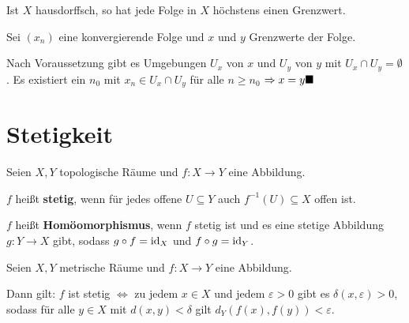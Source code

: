 \begin{bemerkung}
    Ist $X$ hausdorffsch, so hat jede Folge in $X$ höchstens einen
    Grenzwert.
\end{bemerkung}

\begin{beweis}
    Sei $(x_n)$ eine konvergierende Folge und $x$ und $y$ Grenzwerte der Folge.

    Nach Voraussetzung gibt es Umgebungen $U_x$ von $x$ und $U_y$
    von $y$ mit $U_x \cap U_y = \emptyset$. Es existiert ein
    $n_0$ mit $x_n \in U_x \cap U_y$ für alle $n \geq n_0$
    $\Rightarrow x = y \qed$
\end{beweis}

\section{Stetigkeit}
\begin{definition}
    Seien $X, Y$ topologische Räume und $f:X \rightarrow Y$ eine Abbildung.

    \begin{defenum}
        \item $f$ heißt \textbf{stetig}, wenn für jedes offene 
              $U \subseteq Y$ auch $f^{-1} (U) \subseteq X$ offen ist. \label{def:stetigkeit}
        \item $f$ heißt \textbf{Homöomorphismus}, wenn $f$ stetig ist
              und es eine 
              stetige Abbildung  $g: Y \rightarrow X$ gibt, sodass
              $g \circ f = \textnormal{id}_X$ und $f \circ g = \textnormal{id}_Y$.
    \end{defenum}
\end{definition}

\begingroup
\renewcommand{\thmfoot}{\footnotemark}
\begin{bemerkung}
  Seien $X, Y$ metrische Räume und $f\colon X \rightarrow Y$ eine
  Abbildung.

  Dann gilt: $f$ ist stetig $\Leftrightarrow$ zu jedem $x \in X$ und
  jedem $\varepsilon > 0$ gibt es $\delta(x, \varepsilon) > 0$, sodass
  für alle $y \in X$ mit $d(x,y) < \delta $ gilt $d_Y(f(x), f(y)) <
  \varepsilon$.
\end{bemerkung}
\endgroup

